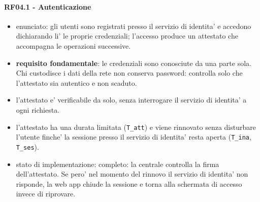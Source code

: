 \documentclass[11pt]{article}
\begin{document}
\paragraph{RF04.1 - Autenticazione}
\label{sec:org49dc2a9}
\begin{itemize}
\item enunciato: gli utenti sono registrati presso il servizio di identita' e accedono dichiarando li'
le proprie credenziali; l'accesso produce un attestato che accompagna le operazioni successive.
\item \textbf{requisito fondamentale}: le credenziali sono conosciute da una parte sola. Chi custodisce i dati
della rete non conserva password: controlla solo che l'attestato sia autentico e non scaduto.
\item l'attestato e' verificabile da solo, senza interrogare il servizio di identita' a ogni richiesta.
\item l'attestato ha una durata limitata (\texttt{T\_att}) e viene rinnovato senza disturbare l'utente finche'
la sessione presso il servizio di identita' resta aperta (\texttt{T\_ina}, \texttt{T\_ses}).
\item stato di implementazione: completo: la centrale controlla la firma dell'attestato. Se pero' nel
momento del rinnovo il servizio di identita' non risponde, la web app chiude la sessione e torna
alla schermata di accesso invece di riprovare.
\end{itemize}
\end{document}
